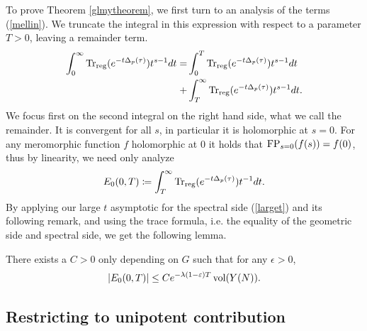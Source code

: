 
\noindent To prove Theorem \ref{glmytheorem}, we first turn to an analysis of the terms (\ref{mellin}). We truncate the integral in this expression with respect to a parameter $T>0$, leaving a remainder term.
\begin{align}\label{trunc}
    \int_0^\infty \operatorname{Tr}_{\operatorname{reg}}(e^{-t\Delta_p(\tau)})t^{s-1}dt = &\int_0^T \operatorname{Tr}_{\operatorname{reg}}(e^{-t\Delta_p(\tau)})t^{s-1}dt \\
    + &\int_T^\infty \operatorname{Tr}_{\operatorname{reg}}(e^{-t\Delta_p(\tau)})t^{s-1}dt.
\end{align}
We focus first on the second integral on the right hand side, what we call the remainder. It is convergent for all $s$, in particular it is holomorphic at $s=0$. For any meromorphic function $f$ holomorphic at $0$ it holds that $\operatorname{FP}_{s=0}(f(s))=f(0)$, thus by linearity, we need only analyze
\begin{align*}
    E_0(0,T)\coloneqq \int_T^\infty \operatorname{Tr}_{\operatorname{reg}}(e^{-t\Delta_p(\tau)})t^{-1}dt.
\end{align*}
By applying our large $t$ asymptotic for the spectral side (\ref{larget}) and its following remark, and using the trace formula, i.e. the equality of the geometric side and spectral side, we get the following lemma.

\begin{lem}\label{error0}
There exists a $C>0$ only depending on $G$ such that for any $\epsilon>0$,
    \begin{align*}
    \vert E_0(0,T)\vert\leq Ce^{-\lambda(1-\varepsilon)T}\operatorname{vol}(Y(N)).
\end{align*}
\end{lem}

\medskip

\subsection{Restricting to unipotent contribution}

